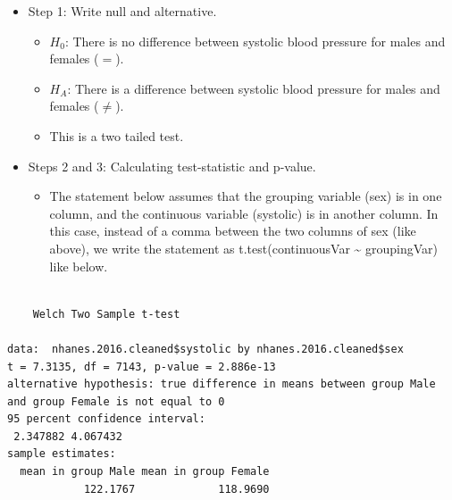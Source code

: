 \documentclass[
  letterpaper,
  DIV=11,
  numbers=noendperiod]{scrreprt}
\newenvironment{Shaded}{\begin{snugshade}}{\end{snugshade}}
\newcommand{\CommentTok}[1]{\textcolor[rgb]{0.37,0.37,0.37}{#1}}
\newcommand{\FloatTok}[1]{\textcolor[rgb]{0.68,0.00,0.00}{#1}}
\newcommand{\FunctionTok}[1]{\textcolor[rgb]{0.28,0.35,0.67}{#1}}
\newcommand{\NormalTok}[1]{\textcolor[rgb]{0.00,0.23,0.31}{#1}}
\newcommand{\SpecialCharTok}[1]{\textcolor[rgb]{0.37,0.37,0.37}{#1}}
\providecommand{\tightlist}{%
  \setlength{\itemsep}{0pt}\setlength{\parskip}{0pt}}\usepackage{longtable,booktabs,array}
\begin{document}
\begin{itemize}
\tightlist
\item
  Step 1: Write null and alternative.

  \begin{itemize}
  \tightlist
  \item
    \(H_0\): There is no difference between systolic blood pressure for
    males and females (\(=\)).
  \item
    \(H_A\): There is a difference between systolic blood pressure for
    males and females (\(\neq\)).
  \item
    This is a two tailed test.
  \end{itemize}
\item
  Steps 2 and 3: Calculating test-statistic and p-value.

  \begin{itemize}
  \tightlist
  \item
    The statement below assumes that the grouping variable (sex) is in
    one column, and the continuous variable (systolic) is in another
    column. In this case, instead of a comma between the two columns of
    sex (like above), we write the statement as t.test(continuousVar
    \textasciitilde{} groupingVar) like below.
  \end{itemize}
\end{itemize}

\begin{Shaded}
\end{Shaded}

\begin{verbatim}

    Welch Two Sample t-test

data:  nhanes.2016.cleaned$systolic by nhanes.2016.cleaned$sex
t = 7.3135, df = 7143, p-value = 2.886e-13
alternative hypothesis: true difference in means between group Male and group Female is not equal to 0
95 percent confidence interval:
 2.347882 4.067432
sample estimates:
  mean in group Male mean in group Female 
            122.1767             118.9690 
\end{verbatim}
\end{document}
